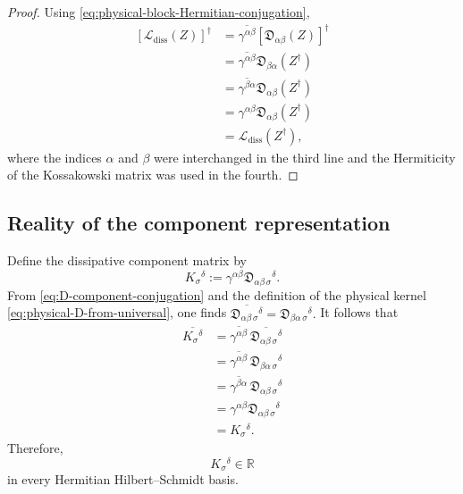 \documentclass[notitlepage,aip,reprint,onecolumn]{revtex4-1}
\theoremstyle{definition}
\begin{document}
\begin{proof}
Using \eqref{eq:physical-block-Hermitian-conjugation},
\begin{align*}
    \left[
    \mathcal L_{\mathrm{diss}}(Z)
    \right]^\dagger
    &=
    \overline{\gamma^{\alpha\beta}}
    \left[
    \mathfrak{D}_{\alpha\beta}(Z)
    \right]^\dagger
    \\
    &=
    \overline{\gamma^{\alpha\beta}}
    \mathfrak{D}_{\beta\alpha}(Z^\dagger)
    \\
    &=
    \overline{\gamma^{\beta\alpha}}
    \mathfrak{D}_{\alpha\beta}(Z^\dagger)
    \\
    &=
    \gamma^{\alpha\beta}
    \mathfrak{D}_{\alpha\beta}(Z^\dagger)
    \\
    &=
    \mathcal L_{\mathrm{diss}}(Z^\dagger),
\end{align*}
where the indices \(\alpha\) and \(\beta\) were interchanged in the third line and the Hermiticity of the Kossakowski matrix was used in the fourth.
\end{proof}

\subsection{Reality of the component representation}

Define the dissipative component matrix by
\begin{equation}\label{eq:physical-dissipative-matrix}
    K_\sigma{}^\delta
    :=
    \gamma^{\alpha\beta}
    \mathfrak{D}_{\alpha\beta\,\sigma}{}^\delta.
\end{equation}
From \eqref{eq:D-component-conjugation} and the definition of the physical kernel \eqref{eq:physical-D-from-universal}, one finds
\(
\overline{
\mathfrak{D}_{\alpha\beta\,\sigma}{}^\delta
}
=
\mathfrak{D}_{\beta\alpha\,\sigma}{}^\delta.
\)
It follows that
\begin{align*}
\overline{K_\sigma{}^\delta}
&=
\overline{\gamma^{\alpha\beta}}\,
\overline{
\mathfrak{D}_{\alpha\beta\,\sigma}{}^\delta
}
\\
&=
\overline{\gamma^{\alpha\beta}}\,
\mathfrak{D}_{\beta\alpha\,\sigma}{}^\delta
\\
&=
\overline{\gamma^{\beta\alpha}}\,
\mathfrak{D}_{\alpha\beta\,\sigma}{}^\delta
\\
&=
\gamma^{\alpha\beta}
\mathfrak{D}_{\alpha\beta\,\sigma}{}^\delta
\\
&=
K_\sigma{}^\delta.
\end{align*}
Therefore,
\begin{equation}\label{eq:physical-dissipative-matrix-real}
K_\sigma{}^\delta
\in\mathbb R
\end{equation}
in every Hermitian Hilbert--Schmidt basis.
\end{document}

